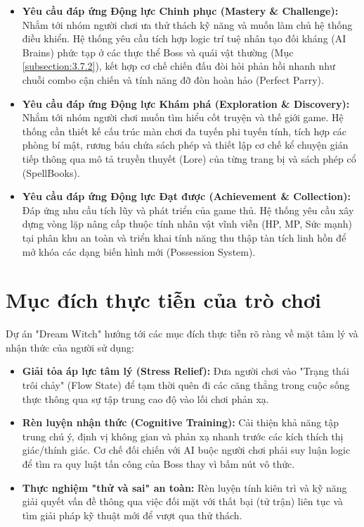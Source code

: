 \documentclass[../DoAn.tex]{subfiles}
\begin{document}
\begin{itemize}
    \item \textbf{Yêu cầu đáp ứng Động lực Chinh phục (Mastery \& Challenge):}
    Nhắm tới nhóm người chơi ưa thử thách kỹ năng và muốn làm chủ hệ thống điều khiển. Hệ thống yêu cầu tích hợp logic trí tuệ nhân tạo đối kháng (AI Brains) phức tạp ở các thực thể Boss và quái vật thường (Mục \ref{subsection:3.7.2}), kết hợp cơ chế chiến đấu đòi hỏi phản hồi nhanh như chuỗi combo cận chiến và tính năng đỡ đòn hoàn hảo (Perfect Parry).
    
    \item \textbf{Yêu cầu đáp ứng Động lực Khám phá (Exploration \& Discovery):}
    Nhắm tới nhóm người chơi muốn tìm hiểu cốt truyện và thế giới game. Hệ thống cần thiết kế cấu trúc màn chơi đa tuyến phi tuyến tính, tích hợp các phòng bí mật, rương báu chứa sách phép và thiết lập cơ chế kể chuyện gián tiếp thông qua mô tả truyền thuyết (Lore) của từng trang bị và sách phép cổ (SpellBooks).
    
    \item \textbf{Yêu cầu đáp ứng Động lực Đạt được (Achievement \& Collection):}
    Đáp ứng nhu cầu tích lũy và phát triển của game thủ. Hệ thống yêu cầu xây dựng vòng lặp nâng cấp thuộc tính nhân vật vĩnh viễn (HP, MP, Sức mạnh) tại phân khu an toàn và triển khai tính năng thu thập tàn tích linh hồn để mở khóa các dạng biến hình mới (Possession System).
\end{itemize}

\section{Mục đích thực tiễn của trò chơi}
\label{section:2.3}

Dự án "Dream Witch" hướng tới các mục đích thực tiễn rõ ràng về mặt tâm lý và nhận thức của người sử dụng:
\begin{itemize}
    \item \textbf{Giải tỏa áp lực tâm lý (Stress Relief):} Đưa người chơi vào "Trạng thái trôi chảy" (Flow State) để tạm thời quên đi các căng thẳng trong cuộc sống thực thông qua sự tập trung cao độ vào lối chơi phản xạ.
    \item \textbf{Rèn luyện nhận thức (Cognitive Training):} Cải thiện khả năng tập trung chú ý, định vị không gian và phản xạ nhanh trước các kích thích thị giác/thính giác. Cơ chế đối chiến với AI buộc người chơi phải suy luận logic để tìm ra quy luật tấn công của Boss thay vì bấm nút vô thức.
    \item \textbf{Thực nghiệm "thử và sai" an toàn:} Rèn luyện tính kiên trì và kỹ năng giải quyết vấn đề thông qua việc đối mặt với thất bại (tử trận) liên tục và tìm giải pháp kỹ thuật mới để vượt qua thử thách.
\end{itemize}
\end{document}
